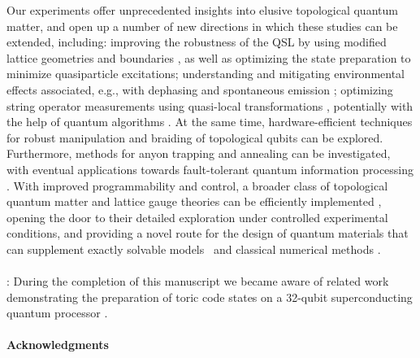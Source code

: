 \documentclass[twocolumn,amssymb,secnumarabic, prl, aps, nofootinbib]{revtex4-1}
\begin{document}
Our experiments offer unprecedented  insights into  elusive topological quantum matter, and open up a number of new directions in which these studies can be extended, including:
improving the robustness of the QSL by using modified lattice geometries and boundaries \cite{Rhine2020a,Ruben2020}, as well as 
optimizing the state preparation to minimize quasiparticle excitations; understanding and mitigating environmental effects associated, e.g., with dephasing and spontaneous emission \cite{Supplement};  
optimizing string operator measurements using quasi-local transformations \cite{HastingsWen2005}, potentially with the help of
quantum algorithms \cite{Cong2019}. 
At the same time, hardware-efficient techniques for  
robust manipulation and braiding of topological qubits can be explored. Furthermore, methods for anyon trapping and annealing can be investigated, with  eventual applications towards fault-tolerant quantum information processing \cite{KitaevPreskill4D}. With improved programmability and control, a broader class of topological quantum matter and lattice gauge theories can be efficiently implemented \cite{CiracLGT2020, Lewenstein2013}, opening the door to their detailed exploration under controlled experimental conditions, and providing a novel route for the design of quantum materials that can supplement exactly solvable models~\cite{Kitaev2003fault, KitaevHoneycomb} and classical numerical methods \cite{White92,Hauschild18}. 
\\\\
: During the completion of this manuscript we became aware of related work demonstrating the preparation of toric code states on a 32-qubit superconducting quantum processor \cite{Google2021}.
\\\\
\textbf{Acknowledgments} 
\\
\end{document}
